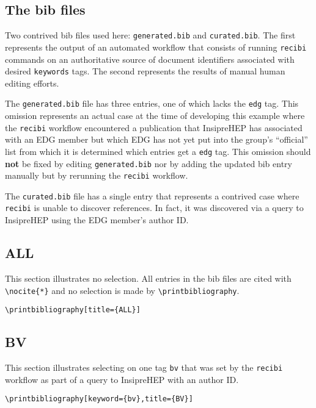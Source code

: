 \documentclass{article}
\begin{document}
\subsection{The bib files}

Two contrived bib files used here: \texttt{generated.bib} and \texttt{curated.bib}.  The first represents the output of an automated workflow that consists of running  \texttt{recibi} commands on an authoritative source of document identifiers associated with desired \texttt{keywords} tags.  The second represents the results of manual human editing efforts.

The \texttt{generated.bib} file has three entries, one of which lacks the \texttt{edg} tag.  This omission represents an actual case at the time of developing this example where the \texttt{recibi} workflow encountered a publication that InsipreHEP has associated with an EDG member but which EDG has not yet put into the group's ``official'' list from which it is determined which entries get a \texttt{edg} tag.  This omission should \textbf{not} be fixed by editing \texttt{generated.bib} nor by adding the updated bib entry manually but by rerunning the \texttt{recibi} workflow.

The \texttt{curated.bib} file has a single entry that represents a contrived case where \texttt{recibi} is unable to discover references.  In fact, it was discovered via a query to InsipreHEP using the EDG member's author ID.


\begin{refsection}
\section{ALL}

This section illustrates no selection.  All entries in the bib files are cited with \verb|\nocite{*}| and no selection is made by \verb|\printbibliography|.

\nocite{*}
\verb|\printbibliography[title={ALL}]|
\printbibliography[title={ALL}]
\end{refsection}


\begin{refsection}
\section{BV}

This section illustrates selecting on one tag \texttt{bv} that was set by the \texttt{recibi} workflow as part of a query to InsipreHEP with an author ID.

\nocite{*}
\noindent \verb|\printbibliography[keyword={bv},title={BV}]|
\printbibliography[keyword={bv},title={BV}]
\end{refsection}
\end{document}
